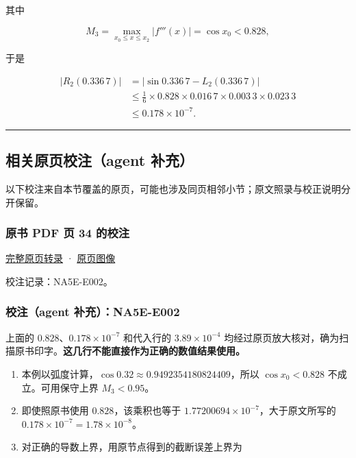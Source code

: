 \documentclass[
  10pt,
  fontset=fandol]{ctexart}
\providecommand{\tightlist}{%
  \setlength{\itemsep}{0pt}\setlength{\parskip}{0pt}}
\begin{document}
其中

\[
M_3=\max_{x_0\le x\le x_2}|f'''(x)|=\cos x_0<0.828,
\]

于是

\[
\begin{aligned}
|R_2(0.336\,7)|
&=|\sin0.336\,7-L_2(0.336\,7)|\\
&\le\frac16\times0.828\times0.016\,7\times0.003\,3\times0.023\,3\\
&\le0.178\times10^{-7}.
\end{aligned}
\]

\begin{center}\rule{0.5\linewidth}{0.5pt}\end{center}

\subsection{相关原页校注（agent 补充）}\label{ux76f8ux5173ux539fux9875ux6821ux6ce8agent-ux8865ux5145}

以下校注来自本节覆盖的原页，可能也涉及同页相邻小节；原文照录与校正说明分开保留。

\subsubsection{原书 PDF 页 34 的校注}\label{ux539fux4e66-pdf-ux9875-34-ux7684ux6821ux6ce8}

\href{../pages/pdf-034.md}{完整原页转录} · \href{../../source-images/pdf-034.jpeg}{原页图像}

校注记录：NA5E-E002。

\subsubsection{校注（agent 补充）：NA5E-E002}\label{ux6821ux6ce8agent-ux8865ux5145na5e-e002}

上面的 \(0.828\)、\(0.178\times10^{-7}\) 和代入行的 \(3.89\times10^{-4}\) 均经过原页放大核对，确为扫描原书印字。\textbf{这几行不能直接作为正确的数值结果使用。}

\begin{enumerate}
\def\labelenumi{\arabic{enumi}.}
\tightlist
\item
  本例以弧度计算，\(\cos0.32\approx0.9492354180824409\)，所以 \(\cos x_0<0.828\) 不成立。可用保守上界 \(M_3<0.95\)。
\item
  即使照原书使用 \(0.828\)，该乘积也等于 \(1.77200694\times10^{-7}\)，大于原文所写的 \(0.178\times10^{-7}=1.78\times10^{-8}\)。
\item
  对正确的导数上界，用原节点得到的截断误差上界为
\end{enumerate}
\end{document}
